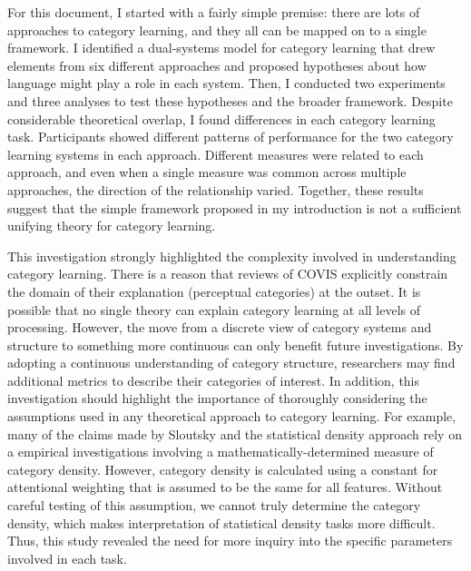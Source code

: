 \documentclass[../dissertation.tex]{subfiles}
\begin{document}
	For this document, I started with a fairly simple premise: there are lots of approaches to category learning, and they all can be mapped on to a single framework. I identified a dual-systems model for category learning that drew elements from six different approaches and proposed hypotheses about how language might play a role in each system. Then, I conducted two experiments and three analyses to test these hypotheses and the broader framework. Despite considerable theoretical overlap, I found differences in each category learning task. Participants showed different patterns of performance for the two category learning systems in each approach. Different measures were related to each approach, and even when a single measure was common across multiple approaches, the direction of the relationship varied. Together, these results suggest that the simple framework proposed in my introduction is not a sufficient unifying theory for category learning. \par 
	This investigation strongly highlighted the complexity involved in understanding category learning. There is a reason that reviews of COVIS explicitly constrain the domain of their explanation (perceptual categories) at the outset. It is possible that no single theory can explain category learning at all levels of processing. However, the move from a discrete view of category systems and structure to something more continuous can only benefit future investigations. By adopting a continuous understanding of category structure, researchers may find additional metrics to describe their categories of interest. In addition, this investigation should highlight the importance of thoroughly considering the assumptions used in any theoretical approach to category learning. For example, many of the claims made by Sloutsky and the statistical density approach rely on a empirical investigations involving a mathematically-determined measure of category density. However, category density is calculated using a constant for attentional weighting that is assumed to be the same for all features. Without careful testing of this assumption, we cannot truly determine the category density, which makes interpretation of statistical density tasks more difficult. Thus, this study revealed the need for more inquiry into the specific parameters involved in each task. \par
\end{document}
